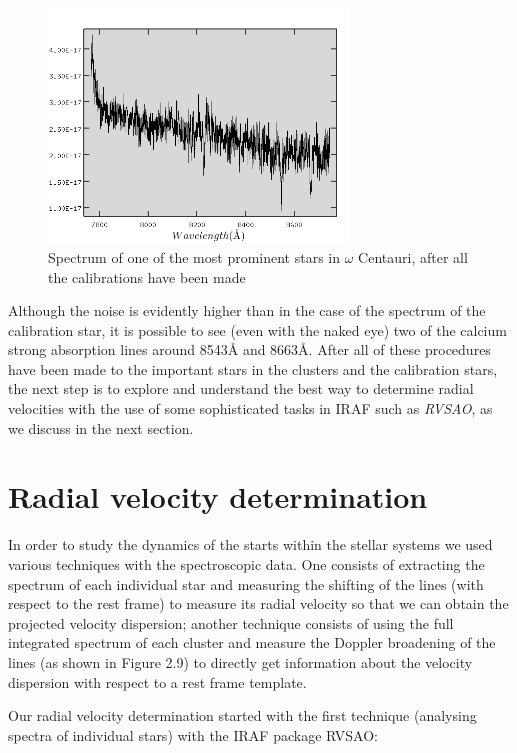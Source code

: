 \begin{figure}[H]
\centering
\includegraphics[width=8cm]{images/cluster_star_flux.png}
\caption[Spectrum of a prominent star of the NGC5139 globular cluster]{Spectrum of one of the most prominent stars in $\omega$ Centauri, after all the calibrations have been made}
\end{figure}

Although the noise is evidently higher than in the case of the spectrum of the calibration star, it is possible to see (even with the naked eye) two of the calcium strong absorption lines around 8543\AA$ $ and 8663\AA. After all of these procedures have been made to the important stars in the clusters and the calibration stars, the next step is to explore and understand the best way to determine radial velocities with the use of some sophisticated tasks in IRAF such as \textit{RVSAO}, as we discuss in the next section. 

\section{Radial velocity determination}

In order to study the dynamics of the starts within the stellar systems we used various techniques with the spectroscopic data. One consists of extracting the spectrum of each individual star and measuring the shifting of the lines (with respect to the rest frame) to measure its radial velocity so that we can obtain the projected velocity dispersion; another technique consists of using the full integrated spectrum of each cluster and measure the Doppler broadening of the lines (as shown in Figure 2.9) to directly get information about the velocity dispersion with respect to a rest frame template. 

Our radial velocity determination started with the first technique (analysing spectra of individual stars) with the IRAF package RVSAO:

